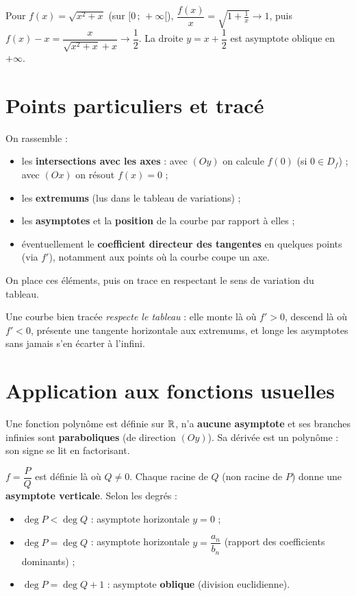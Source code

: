 \begin{exemple}
Pour $f(x)=\sqrt{x^2+x}$ (sur $[0\,;\,+\infty[$), $\dfrac{f(x)}{x}=\sqrt{1+\frac1x}\to 1$,
puis $f(x)-x=\dfrac{x}{\sqrt{x^2+x}+x}\to\dfrac12$. La droite $y=x+\dfrac12$ est asymptote
oblique en $+\infty$.
\end{exemple}

\section{Points particuliers et tracé}

\begin{aretenir}
On rassemble :
\begin{itemize}
  \item les \textbf{intersections avec les axes} : avec $(Oy)$ on calcule $f(0)$ (si
        $0\in D_f$) ; avec $(Ox)$ on résout $f(x)=0$ ;
  \item les \textbf{extremums} (lus dans le tableau de variations) ;
  \item les \textbf{asymptotes} et la \textbf{position} de la courbe par rapport à elles ;
  \item éventuellement le \textbf{coefficient directeur des tangentes} en quelques points
        (via $f'$), notamment aux points où la courbe coupe un axe.
\end{itemize}
On place ces éléments, puis on trace en respectant le sens de variation du tableau.
\end{aretenir}

\begin{remarque}
Une courbe bien tracée \emph{respecte le tableau} : elle monte là où $f'>0$, descend là
où $f'<0$, présente une tangente horizontale aux extremums, et longe les asymptotes
sans jamais s'en écarter à l'infini.
\end{remarque}

\section{Application aux fonctions usuelles}

\begin{propriete}
Une fonction polynôme est définie sur $\mathbb{R}$, n'a \textbf{aucune asymptote} et ses
branches infinies sont \textbf{paraboliques} (de direction $(Oy)$). Sa dérivée est un
polynôme : son signe se lit en factorisant.
\end{propriete}

\begin{propriete}
$f=\dfrac{P}{Q}$ est définie là où $Q\neq 0$. Chaque racine de $Q$ (non racine de $P$)
donne une \textbf{asymptote verticale}. Selon les degrés :
\begin{itemize}
  \item $\deg P<\deg Q$ : asymptote horizontale $y=0$ ;
  \item $\deg P=\deg Q$ : asymptote horizontale $y=\dfrac{a_n}{b_n}$ (rapport des
        coefficients dominants) ;
  \item $\deg P=\deg Q+1$ : asymptote \textbf{oblique} (division euclidienne).
\end{itemize}
\end{propriete}

